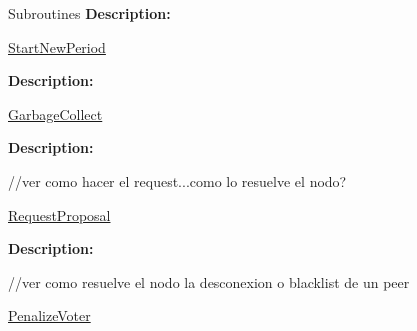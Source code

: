 \documentclass[10pt,a4paper]{article}
\begin{document}
\begin{section}{Subroutines}
\noindent \textbf{Description:}\\


\begin{algorithm}[H]
    \begin{algorithmic}[1]

    \EndFunction
    \end{algorithmic}
    \caption{\underline{StartNewPeriod}}
\end{algorithm}

\noindent \textbf{Description:}\\


\begin{algorithm}[H]
    \begin{algorithmic}[1]

    \EndFunction
    \end{algorithmic}
    \caption{\underline{GarbageCollect}}
\end{algorithm}

\noindent \textbf{Description:}\\


\begin{algorithm}[H]
    \begin{algorithmic}[1]
        //ver como hacer el request...como lo resuelve el nodo?
    \EndFunction
    \end{algorithmic}
    \caption{\underline{RequestProposal}}
\end{algorithm}

\noindent \textbf{Description:}\\


\begin{algorithm}[H]
    \begin{algorithmic}[1]
        //ver como resuelve el nodo la desconexion o blacklist de un peer
    \EndFunction
    \end{algorithmic}
    \caption{\underline{PenalizeVoter}}
\end{algorithm}


\end{section}
\end{document}
